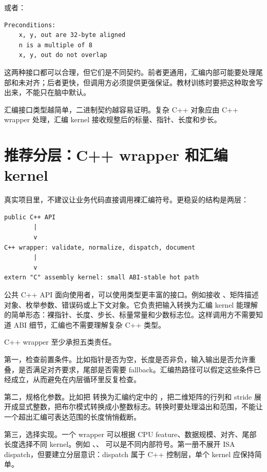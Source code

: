 或者：

\begin{lstlisting}
Preconditions:
    x, y, out are 32-byte aligned
    n is a multiple of 8
    x, y, out do not overlap
\end{lstlisting}

这两种接口都可以合理，但它们是不同契约。前者更通用，汇编内部可能要处理尾部和未对齐；后者更快，但调用方必须提供更强保证。教材训练时要把这种取舍写出来，不能只在脑中默认。

\begin{keyidea}
汇编接口类型越简单，二进制契约越容易证明。复杂 C++ 对象应由 C++ wrapper 处理，汇编 kernel 接收规整后的标量、指针、长度和步长。
\end{keyidea}

\section{推荐分层：C++ wrapper 和汇编 kernel}

真实项目里，不建议让业务代码直接调用裸汇编符号。更稳妥的结构是两层：

\begin{center}
\begin{minipage}{0.84\linewidth}
\begin{verbatim}
public C++ API
        |
        v
C++ wrapper: validate, normalize, dispatch, document
        |
        v
extern "C" assembly kernel: small ABI-stable hot path
\end{verbatim}
\end{minipage}
\end{center}

公共 C++ API 面向使用者，可以使用类型更丰富的接口。例如接收 、矩阵描述对象、枚举参数、错误码或上下文对象。它负责把输入转换为汇编 kernel 能理解的简单形态：裸指针、长度、步长、标量常量和少数标志位。这样调用方不需要知道 ABI 细节，汇编也不需要理解复杂 C++ 类型。

C++ wrapper 至少承担五类责任。

第一，检查前置条件。比如指针是否为空，长度是否非负，输入输出是否允许重叠，是否满足对齐要求，尾部是否需要 fallback。汇编热路径可以假定这些条件已经成立，从而避免在内层循环里反复检查。

第二，规格化参数。比如把  转换为汇编约定中的 ，把二维矩阵的行列和 stride 展开成显式整数，把布尔模式转换成小整数标志。转换时要处理溢出和范围，不能让一个超出汇编可表达范围的长度悄悄截断。

第三，选择实现。一个 wrapper 可以根据 CPU feature、数据规模、对齐、尾部长度选择不同 kernel。例如 、、 可以是不同内部符号。第一册不展开 ISA dispatch，但要建立分层意识：dispatch 属于 C++ 控制层，单个 kernel 应保持简单。

